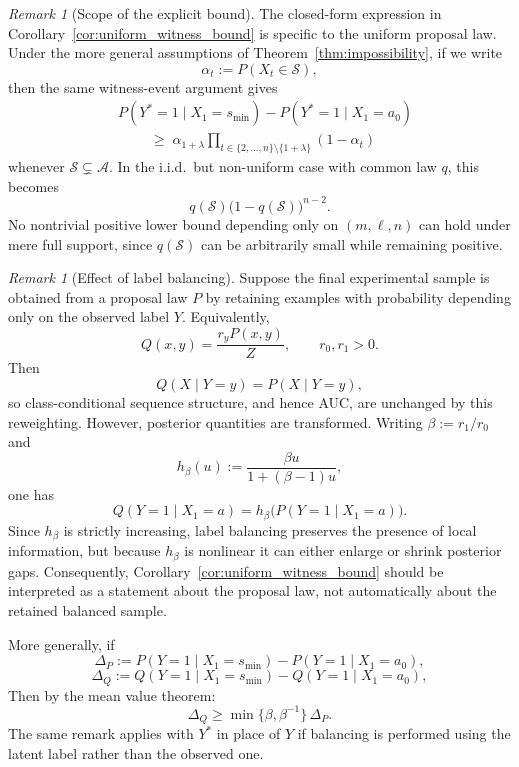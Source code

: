 \documentclass{article} %
\theoremstyle{plain}
\theoremstyle{definition}
\theoremstyle{remark}
\newtheorem{remark}[theorem]{Remark}
\begin{document}
\begin{remark}[Scope of the explicit bound]
\label{rem:scope_uniform_bound}
The closed-form expression in Corollary~\ref{cor:uniform_witness_bound} is
specific to the uniform proposal law. Under the more general assumptions of
Theorem~\ref{thm:impossibility}, if we write
\[
\alpha_t := P(X_t\in\mathcal{S}),
\]
then the same witness-event argument gives
\[
\begin{aligned}
&P(Y^*=1\mid X_1=s_{\min})
-
P(Y^*=1\mid X_1=a_0)\\
&\qquad\;\ge\;
\alpha_{1+\lambda}
\prod_{t\in\{2,\ldots,n\}\setminus\{1+\lambda\}}(1-\alpha_t)
\end{aligned}
\]
whenever $\mathcal{S}\subsetneq\mathcal{A}$.
In the i.i.d.\ but non-uniform case with common law $q$, this becomes
\[
q(\mathcal{S})\bigl(1-q(\mathcal{S})\bigr)^{n-2}.
\]
No nontrivial positive lower bound depending only on $(m,\ell,n)$ can hold under
mere full support, since $q(\mathcal{S})$ can be arbitrarily small while
remaining positive.
\end{remark}

\begin{remark}[Effect of label balancing]
\label{rem:label_balancing}
Suppose the final experimental sample is obtained from a proposal law $P$ by
retaining examples with probability depending only on the observed label $Y$.
Equivalently,
\[
Q(x,y)=\frac{r_y P(x,y)}{Z},
\qquad r_0,r_1>0.
\]
Then
\[
Q(X\mid Y=y)=P(X\mid Y=y),
\]
so class-conditional sequence structure, and hence AUC, are unchanged by this
reweighting. However, posterior quantities are transformed. Writing
$\beta:=r_1/r_0$ and
\[
h_\beta(u):=\frac{\beta u}{1+(\beta-1)u},
\]
one has
\[
Q(Y=1\mid X_1=a)
=
h_\beta\!\bigl(P(Y=1\mid X_1=a)\bigr).
\]
Since $h_\beta$ is strictly increasing, label balancing preserves the presence of
local information, but because $h_\beta$ is nonlinear it can either enlarge or
shrink posterior gaps. Consequently,
Corollary~\ref{cor:uniform_witness_bound} should be interpreted as a statement
about the proposal law, not automatically about the retained balanced sample.

More generally, if
\[
\Delta_P := P(Y=1\mid X_1=s_{\min}) - P(Y=1\mid X_1=a_0),
\]
\[
\Delta_Q := Q(Y=1\mid X_1=s_{\min}) - Q(Y=1\mid X_1=a_0),
\]
Then by the mean value theorem:
\[
\Delta_Q \ge \min\{\beta,\beta^{-1}\}\,\Delta_P.
\]
The same remark applies with $Y^*$ in place of $Y$ if balancing is performed
using the latent label rather than the observed one.
\end{remark}
\end{document}
